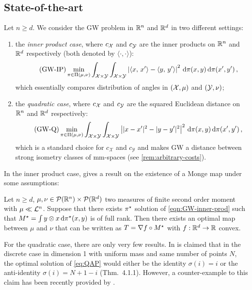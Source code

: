 \subsection{State-of-the-art}
Let $n\geq d$. We consider the GW problem in $\mathbb{R}^n$ and $\mathbb{R}^d$ in two different settings:
\begin{enumerate}[label=(\roman*),noitemsep]
    \item the \emph{inner product case}, where $c_{\mathcal{X}}$ and $c_{\mathcal{Y}}$ are the inner products on $\mathbb{R}^n$ and $\mathbb{R}^d$ respectively (both denoted by $\langle \cdot, \cdot \rangle$):
        \begin{equation}
            \tag{GW-IP}
            \min _{\pi \in \Pi(\mu, \nu)} \int_{\mathcal{X}\times\mathcal{Y}}\int_{\mathcal{X}\times\mathcal{Y}}\left|\langle x,\, x'\rangle-\langle y,\, y'\rangle\right|^{2} \,\mathrm d\pi(x, y) \,\mathrm d\pi(x', y')\,,
            \label{eqn:GW-inner-prod}
        \end{equation}
        which essentially compares distribution of angles in $(\mathcal{X},\mu)$ and $(\mathcal{Y},\nu)$;
        \item the \emph{quadratic case}, where $c_{\mathcal{X}}$ and $c_{\mathcal{Y}}$ are the squared Euclidean distance on $\mathbb{R}^n$ and $\mathbb{R}^d$ respectively:
        \begin{equation}
            \tag{GW-Q}
            \min _{\pi \in \Pi(\mu, \nu)} \int_{\mathcal{X}\times\mathcal{Y}}\int_{\mathcal{X}\times\mathcal{Y}}\left||x-x'|^2-|y-y'|^2\right|^{2} \,\mathrm d\pi(x, y) \,\mathrm d\pi(x', y')\,,
            \label{eqn:GW-quadratic}
        \end{equation}
        which is a standard choice for $c_{\mathcal{X}}$ and $c_{\mathcal{Y}}$ and makes GW a distance between strong isometry classes of mm-spaces (see \cref{rem:arbitrary-costs}).
    \end{enumerate}
In the inner product case, \cite[Thm.~4.2.3]{vayer2020contribution} gives a result on the existence of a Monge map under some assumptions:
\begin{proposition}
    \label{prop:sota-titouan}
    Let $n\geq d$, $\mu, \nu\in \mathcal{P}(\mathbb{R}^n)\times \mathcal{P}(\mathbb{R}^d)$ two measures of finite second order moment with $\mu\ll\mathcal{L}^n$. Suppose that there exists $\pi^\star$ solution of \cref{eqn:GW-inner-prod} such that $M^\star=\int y\otimes x \,\mathrm d\pi^\star(x, y)$ is of full rank. Then there exists an optimal map between $\mu$ and $\nu$ that can be written as
    $T=\nabla f\circ M^\star$ with $f: \mathbb{R}^d \to \mathbb{R}$ convex.
\end{proposition}

For the quadratic case, there are only very few results. In \cite{vayer2020contribution} is claimed that in the discrete case in dimension 1 with uniform mass and same number of points $N$, the optimal solution of \cref{eq:QAP} would either be the identity $\sigma(i)=i$ or the anti-identity $\sigma(i)=N+1-i$ (Thm.~4.1.1). However, a counter-example to this claim has been recently provided by \cite{beinert2022assignment}.

